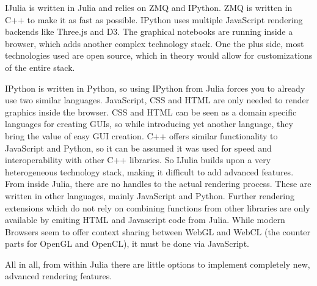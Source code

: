 IJulia is written in Julia and relies on ZMQ and IPython.
ZMQ is written in C++ to make it as fast as possible.
IPython uses multiple JavaScript rendering backends like Three.js and D3.
The graphical notebooks are running inside a browser, which adds another complex technology stack.
One the plus side, most technologies used are open source, which in theory would allow for customizations of the entire stack.

IPython is written in Python, so using IPython from Julia forces you to already use two similar languages.
JavaScript, CSS and HTML are only needed to render graphics inside the browser. CSS and HTML can be seen as a domain specific languages for creating \ac{GUI}s, so while introducing yet another language, they bring the value of easy \ac{GUI} creation.
C++ offers similar functionality to JavaScript and Python, so it can be assumed it was used for speed and interoperability with other C++ libraries.
So IJulia builds upon a very heterogeneous technology stack, making it difficult to add advanced features.
From inside Julia, there are no handles to the actual rendering process. These are written in other languages, mainly JavaScript and Python.
Further rendering extensions which do not rely on combining functions from other libraries are only available by emiting HTML and Javascript code from Julia.
While modern Browsers seem to offer context sharing between WebGL and WebCL (the counter parts for OpenGL and OpenCL), it must be done via JavaScript.

All in all, from within Julia there are little options to implement completely new, advanced rendering features.



